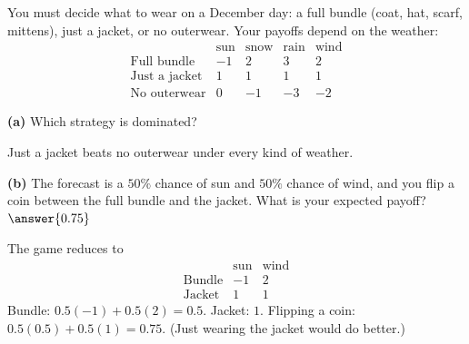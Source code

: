 \documentclass[12pt]{ximera}
\begin{document}
\begin{problem}
You must decide what to wear on a December day: a full bundle (coat, hat, scarf, mittens),
just a jacket, or no outerwear. Your payoffs depend on the weather:
\[
\begin{array}{r|rrrr}
 & \text{sun} & \text{snow} & \text{rain} & \text{wind}\\\hline
\text{Full bundle} & -1 & 2 & 3 & 2\\
\text{Just a jacket} & 1 & 1 & 1 & 1\\
\text{No outerwear} & 0 & -1 & -3 & -2
\end{array}
\]

\begin{prompt}
\textbf{(a)} Which strategy is dominated?
\begin{multipleChoice}
\end{multipleChoice}
\begin{feedback}
Just a jacket beats no outerwear under every kind of weather.
\end{feedback}
\end{prompt}

\begin{prompt}
\textbf{(b)} The forecast is a $50\%$ chance of sun and $50\%$ chance of wind, and you
flip a coin between the full bundle and the jacket. What is your expected payoff?
$\answer{0.75}$
\begin{feedback}
The game reduces to
\[
\begin{array}{r|rr}
 & \text{sun} & \text{wind}\\\hline
\text{Bundle} & -1 & 2\\
\text{Jacket} & 1 & 1
\end{array}
\]
Bundle: $0.5(-1)+0.5(2)=0.5$. Jacket: $1$. Flipping a coin: $0.5(0.5)+0.5(1)=0.75$. (Just
wearing the jacket would do better.)
\end{feedback}
\end{prompt}
\end{problem}
\end{document}
